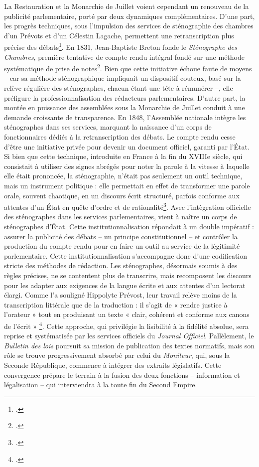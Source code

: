 La Restauration et la Monarchie de Juillet voient cependant un renouveau de la publicité parlementaire, porté par deux dynamiques complémentaires. D’une part, les progrès techniques, sous l'impulsion des services de sténographie des chambres d'un Prévots et d'un Célestin Lagache, permettent une retranscription plus précise des débats\footcite[][]{coniez}. En 1831, Jean-Baptiste Breton fonde le \emph{Sténographe des Chambres}, première tentative de compte rendu intégral fondé sur une méthode systématique de prise de notes\footcite[][]{coniez}. Bien que cette initiative échoue faute de moyens -- car sa méthode sténographique impliquait un dispositif couteux, basé sur la relève régulière des sténographes, chacun étant une tête à rémunérer --, elle préfigure la professionnalisation des rédacteurs parlementaires. D’autre part, la montée en puissance des assemblées sous la Monarchie de Juillet conduit à une demande croissante de transparence. En 1848, l’Assemblée nationale intègre les sténographes dans ses services, marquant la naissance d’un corps de fonctionnaires dédiés à la retranscription des débats. Le compte rendu cesse d’être une initiative privée pour devenir un document officiel, garanti par l’État. Si bien que cette technique, introduite en France à la fin du XVIIIe siècle, qui consistait à utiliser des signes abrégés pour noter la parole à la vitesse à laquelle elle était prononcée, la sténographie, n’était pas seulement un outil technique, mais un instrument politique : elle permettait en effet de transformer une parole orale, souvent chaotique, en un discours écrit structuré, parfois conforme aux attentes d’un État en quête d’ordre et de rationalité\footcite[][]{morel}. Avec l'intègration officielle des sténographes dans les services parlementaires, vient à naître un corps de sténographes d’État. Cette institutionnalisation répondait à un double impératif : assurer la publicité des débats -- un principe constitutionnel -- et contrôler la production du compte rendu pour en faire un outil au service de la légitimité parlementaire. Cette institutionnalisation s’accompagne donc d’une codification stricte des méthodes de rédaction. Les sténographes, désormais soumis à des règles précises, ne se contentent plus de transcrire, mais recomposent les discours pour les adapter aux exigences de la langue écrite et aux attentes d’un lectorat élargi. Comme l’a souligné Hippolyte Prévost, leur travail relève moins de la transcription littérale que de la traduction : il s’agit de « rendre justice à l’orateur » tout en produisant un texte « clair, cohérent et conforme aux canons de l’écrit » \footcite[][]{morelcr}. Cette approche, qui privilégie la lisibilité à la fidélité absolue, sera reprise et systématisée par les services officiels du \emph{Journal Officiel}. Pallèlement, le \emph{Bulletin des lois} poursuit sa mission de publication des textes normatifs, mais son rôle se trouve progressivement absorbé par celui du \emph{Moniteur}, qui, sous la Seconde République, commence à intégrer des extraits législatifs. Cette convergence prépare le terrain à la fusion des deux fonctions – information et légalisation – qui interviendra à la toute fin du Second Empire.

